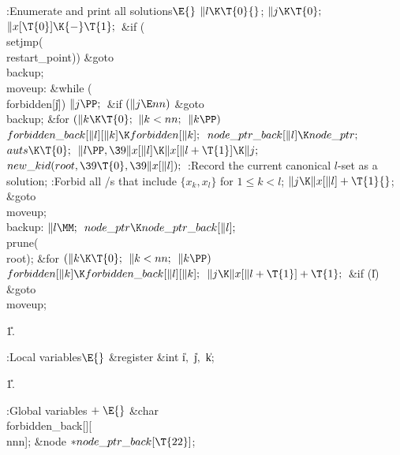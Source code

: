\Y\B\4:Enumerate and print all solutions\X${}\E{}$\6
$\|l\K\T{0}{}$;\5
${}\|j\K\T{0};{}$\6
${}\|x[\T{0}]\K{-}\T{1};{}$\6
\&{if} (\\{setjmp}(\\{restart\_point}))\1\5
\&{goto} \\{backup};\2\6
\4\\{moveup}:\5
\&{while} (\\{forbidden}[\|j])\1\5
${}\|j\PP;{}$\2\6
\&{if} ${}(\|j\E\\{nn}){}$\1\5
\&{goto} \\{backup};\2\6
\&{for} ${}(\|k\K\T{0};{}$ ${}\|k<\\{nn};{}$ ${}\|k\PP){}$\1\5
${}\\{forbidden\_back}[\|l][\|k]\K\\{forbidden}[\|k];{}$\2\6
${}\\{node\_ptr\_back}[\|l]\K\\{node\_ptr};{}$\6
${}\\{auts}\K\T{0};{}$\6
${}\|l\PP,\39\|x[\|l]\K\|x[\|l+\T{1}]\K\|j;{}$\6
${}\\{new\_kid}(\\{root},\39\T{0},\39\|x[\|l]);{}$\6
:Record the current canonical $l$-set as a solution\X;\6
:Forbid all \SET/s that include $\{x_k,x_l\}$ for $1\le k<l$\X;\6
${}\|j\K\|x[\|l]+\T{1}{}$;\5
\&{goto} \\{moveup};\6
\4\\{backup}:\5
${}\|l\MM;{}$\6
${}\\{node\_ptr}\K\\{node\_ptr\_back}[\|l];{}$\6
\\{prune}(\\{root});\6
\&{for} ${}(\|k\K\T{0};{}$ ${}\|k<\\{nn};{}$ ${}\|k\PP){}$\1\5
${}\\{forbidden}[\|k]\K\\{forbidden\_back}[\|l][\|k];{}$\2\6
${}\|j\K\|x[\|l+\T{1}]+\T{1};{}$\6
\&{if} (\|l)\1\5
\&{goto} \\{moveup};\2\par
\U1.\fi

\B{}:Local variables\X${}\E{}$\6
\&{register} \&{int} \|i${},{}$ \|j${},{}$ \|k;\par
\U1.\fi

\B{}:Global variables\X${}\mathrel+\E{}$\6
\&{char} \\{forbidden\_back}[][\\{nnn}];\6
\&{node} ${}{*}\\{node\_ptr\_back}[\T{22}]{}$;\par
\fi

